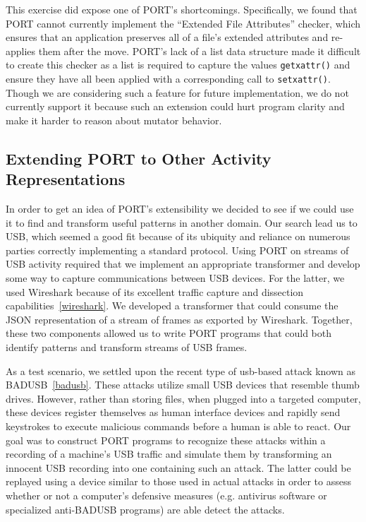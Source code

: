 This exercise did expose one of PORT's shortcomings.  Specifically,
we found that PORT cannot currently implement the ``Extended File
Attributes'' checker, which
 ensures that an application
preserves all of a file's extended attributes and re-applies them after the move.
PORT's lack of a list data structure made it difficult to create this checker as a
list is required to capture the values {\tt getxattr()}
and ensure they have all been applied with a
corresponding call to {\tt setxattr()}.
Though we are considering such a feature for future implementation,
we do not currently support it because such an extension could
hurt program clarity and make it harder to reason about
mutator behavior.


\subsection{Extending PORT to Other Activity Representations}

In order to get an idea of PORT’s extensibility we decided to see if we could use it to find and transform useful patterns in another domain.
Our search lead us to USB, which seemed a good fit because of its ubiquity and reliance on numerous parties correctly implementing a standard protocol.
Using PORT on streams of USB activity required that we implement an appropriate transformer and develop some way to capture communications between USB devices.
For the latter, we used Wireshark because of its excellent traffic capture and dissection capabilities~\ref{wireshark}.
We developed a transformer that could consume the JSON representation of a stream of frames as exported by Wireshark.
Together, these two components allowed us to write PORT programs that could both identify patterns and transform streams of USB frames.

As a test scenario, we settled upon the recent type of usb-based attack known as BADUSB~\ref{badusb}.
These attacks utilize small USB devices that resemble thumb drives. However, rather than storing files, when plugged into a targeted computer, these devices register themselves as human interface devices and rapidly send keystrokes to execute malicious commands before a human is able to react.
Our goal was to construct PORT programs to recognize these attacks within a recording of a machine’s USB traffic and simulate them by transforming an innocent USB recording into one containing such an attack.
The latter could be replayed using a device similar to those used in actual attacks in order to assess whether or not a computer’s defensive measures (e.g. antivirus software or specialized anti-BADUSB programs) are able detect the attacks. 

